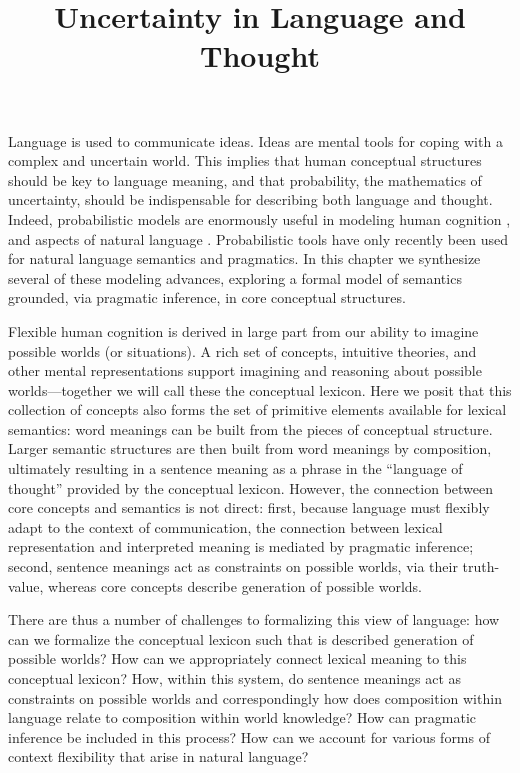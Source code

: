 \documentclass[12pt]{article}
\title{Uncertainty in Language and Thought}
\begin{document}
\listoftodos
\pagebreak


\maketitle

\abstract{}




\tableofcontents

\pagebreak



Language is used to communicate ideas. Ideas are mental tools for coping with a complex and uncertain world. This implies that human conceptual structures should be key to language meaning, and that probability, the mathematics of uncertainty, should be indispensable for describing both language and thought. Indeed, probabilistic models are enormously useful in modeling human cognition \cite{Tenenbaum, etc}, and aspects of natural language \cite{ChaterManning}. Probabilistic tools have only recently been used for natural language semantics and pragmatics. In this chapter we synthesize several of these modeling advances, exploring a formal model of semantics grounded, via pragmatic inference, in core conceptual structures.

Flexible human cognition is derived in large part from our ability to imagine possible worlds (or situations). 
A rich set of concepts, intuitive theories, and other mental representations support imagining and reasoning about possible worlds---together we will call these the conceptual lexicon. 
Here we posit that this collection of concepts also forms the set of primitive elements available for lexical semantics: word meanings can be built from the pieces of conceptual structure. Larger semantic structures are then built from word meanings by composition, ultimately resulting in a sentence meaning as a phrase in the ``language of thought'' provided by the conceptual lexicon.
However, the connection between core concepts and semantics is not direct: 
first, because language must flexibly adapt to the context of communication, the connection between lexical representation and interpreted meaning is mediated by pragmatic inference;
second, sentence meanings act as constraints on possible worlds, via their truth-value, whereas core concepts describe generation of possible worlds.

There are thus a number of challenges to formalizing this view of language: how can we formalize the conceptual lexicon such that is described generation of possible worlds? How can we appropriately connect lexical meaning to this conceptual lexicon? How, within this system, do sentence meanings act as constraints on possible worlds and correspondingly how does composition within language relate to composition within world knowledge?  How can pragmatic inference be included in this process? How can we account for various forms of context flexibility that arise in natural language?
\end{document}
